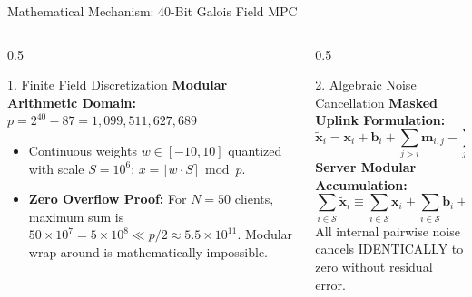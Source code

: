 \documentclass[aspectratio=169,10pt]{beamer}
\begin{document}
\begin{frame}{Mathematical Mechanism: 40-Bit Galois Field MPC}
  \begin{columns}[T]
    \begin{column}{0.5\textwidth}
      \begin{block}{1. Finite Field Discretization}
        \small
        \textbf{Modular Arithmetic Domain:}\\
        $p = 2^{40} - 87 = 1{,}099{,}511{,}627{,}689$
        \vspace{0.1cm}
        \begin{itemize}[itemsep=2pt]
          \item Continuous weights $w \in [-10, 10]$ quantized with scale $S = 10^6$: $x = \lfloor w \cdot S \rceil \bmod p$.
          \item \textbf{Zero Overflow Proof:} For $N=50$ clients, maximum sum is $50 \times 10^7 = 5 \times 10^8 \ll p/2 \approx 5.5 \times 10^{11}$. Modular wrap-around is mathematically impossible.
        \end{itemize}
      \end{block}
    \end{column}
    \begin{column}{0.5\textwidth}
      \begin{block}{2. Algebraic Noise Cancellation}
        \small
        \textbf{Masked Uplink Formulation:}
        \begin{equation*}
          \widetilde{\mathbf{x}}_i = \mathbf{x}_i + \mathbf{b}_i + \sum_{j > i} \mathbf{m}_{i,j} - \sum_{j < i} \mathbf{m}_{j,i} \pmod p
        \end{equation*}
        \textbf{Server Modular Accumulation:}
        \begin{equation*}
          \sum_{i \in \mathcal{S}} \widetilde{\mathbf{x}}_i \equiv \sum_{i \in \mathcal{S}} \mathbf{x}_i + \sum_{i \in \mathcal{S}} \mathbf{b}_i + \mathbf{0} \pmod p
        \end{equation*}
        All internal pairwise noise cancels IDENTICALLY to zero without residual error.
      \end{block}
    \end{column}
  \end{columns}
\end{frame}
\end{document}
